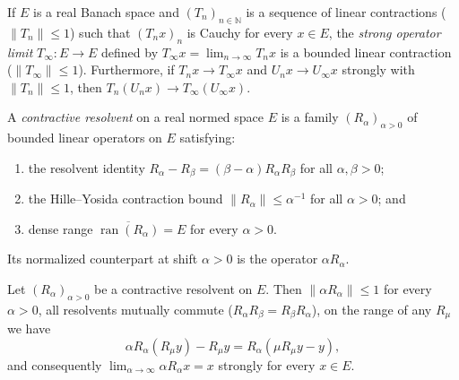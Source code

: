 \begin{definition}\label{def:strong_operator_limit}
\leanok
If $E$ is a real Banach space and $(T_n)_{n \in \mathbb{N}}$ is a sequence of linear contractions ($\lVert T_n \rVert \le 1$) such that $(T_n x)_n$ is Cauchy for every $x \in E$, the \emph{strong operator limit} $T_\infty : E \to E$ defined by $T_\infty x = \lim_{n \to \infty} T_n x$ is a bounded linear contraction ($\lVert T_\infty \rVert \le 1$). Furthermore, if $T_n x \to T_\infty x$ and $U_n x \to U_\infty x$ strongly with $\lVert T_n \rVert \le 1$, then $T_n(U_n x) \to T_\infty(U_\infty x)$.
\end{definition}

\begin{definition}\label{def:contractive_resolvent}
\leanok
A \emph{contractive resolvent} on a real normed space $E$ is a family $(R_\alpha)_{\alpha > 0}$ of bounded linear operators on $E$ satisfying:
\begin{enumerate}
  \item the resolvent identity $R_\alpha - R_\beta = (\beta - \alpha) R_\alpha R_\beta$ for all $\alpha, \beta > 0$;
  \item the Hille--Yosida contraction bound $\lVert R_\alpha \rVert \le \alpha^{-1}$ for all $\alpha > 0$; and
  \item dense range $\overline{\operatorname{ran}(R_\alpha)} = E$ for every $\alpha > 0$.
\end{enumerate}
Its normalized counterpart at shift $\alpha > 0$ is the operator $\alpha R_\alpha$.
\end{definition}

\begin{theorem}\label{thm:contractive_resolvent_normalization}
\leanok
Let $(R_\alpha)_{\alpha > 0}$ be a contractive resolvent on $E$. Then $\lVert \alpha R_\alpha \rVert \le 1$ for every $\alpha > 0$, all resolvents mutually commute ($R_\alpha R_\beta = R_\beta R_\alpha$), on the range of any $R_\mu$ we have
\[
  \alpha R_\alpha(R_\mu y) - R_\mu y = R_\alpha(\mu R_\mu y - y),
\]
and consequently $\lim_{\alpha \to \infty} \alpha R_\alpha x = x$ strongly for every $x \in E$.
\end{theorem}

